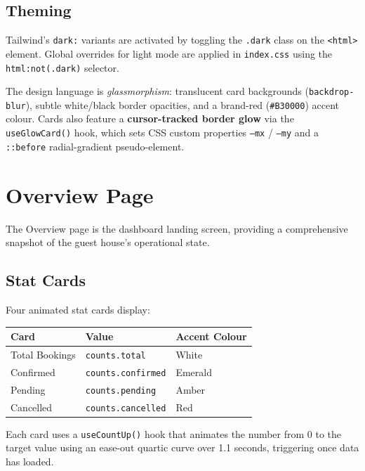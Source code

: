 \documentclass[12pt,a4paper]{report}
\begin{document}
\subsection{Theming}

Tailwind's \texttt{dark:} variants are activated by toggling the \texttt{.dark}
class on the \texttt{<html>} element. Global overrides for light mode are
applied in \texttt{index.css} using the \texttt{html:not(.dark)} selector.

The design language is \emph{glassmorphism}: translucent card backgrounds
(\texttt{backdrop-blur}), subtle white/black border opacities, and a brand-red
(\texttt{\#B30000}) accent colour. Cards also feature a \textbf{cursor-tracked
border glow} via the \texttt{useGlowCard()} hook, which sets CSS custom
properties \texttt{--mx} / \texttt{--my} and a \texttt{::before} radial-gradient
pseudo-element.

\section{Overview Page}

The Overview page is the dashboard landing screen, providing a comprehensive
snapshot of the guest house's operational state.

\subsection{Stat Cards}

Four animated stat cards display:

\begin{center}
\begin{tabular}{lll}
  \toprule
  \textbf{Card} & \textbf{Value} & \textbf{Accent Colour} \\
  \midrule
  Total Bookings & \texttt{counts.total}     & White \\
  Confirmed      & \texttt{counts.confirmed} & Emerald \\
  Pending        & \texttt{counts.pending}   & Amber \\
  Cancelled      & \texttt{counts.cancelled} & Red \\
  \bottomrule
\end{tabular}
\end{center}

Each card uses a \texttt{useCountUp()} hook that animates the number from 0 to
the target value using an ease-out quartic curve over 1.1 seconds, triggering
once data has loaded.
\end{document}
